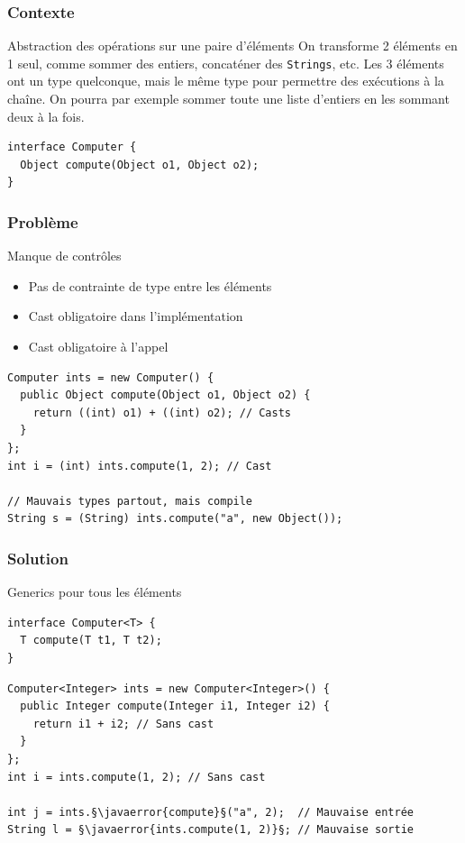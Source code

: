 \documentclass[draft]{beamer}
\makeatletter
\def\uwave{\bgroup\markoverwith{\lower4\p@\hbox{\sixly \textcolor{errorcolor}{\char58}}}\ULon}
\newcommand{\javaerror}[1]{%
  \uwave{#1}%
}
\makeatother
\begin{document}
\begin{frame}[fragile]
\frametitle{Contexte}
\begin{block}{Abstraction des opérations sur une paire d'éléments}
 On transforme 2 éléments en 1 seul, comme sommer des entiers, concaténer des \lstinline{Strings}, etc.
 Les 3 éléments ont un type quelconque, mais le même type pour permettre des exécutions à la chaîne.
 On pourra par exemple sommer toute une liste d'entiers en les sommant deux à la fois.
\end{block}
\begin{lstlisting}
interface Computer {
  Object compute(Object o1, Object o2);
}
\end{lstlisting}
\end{frame}

\begin{frame}[fragile]
\frametitle{Problème}
\begin{alertblock}{Manque de contrôles}
 \begin{itemize}
  \item Pas de contrainte de type entre les éléments
  \item Cast obligatoire dans l'implémentation
  \item Cast obligatoire à l'appel
 \end{itemize}
\end{alertblock}
\begin{lstlisting}
Computer ints = new Computer() {
  public Object compute(Object o1, Object o2) {
    return ((int) o1) + ((int) o2); // Casts
  }
};
int i = (int) ints.compute(1, 2); // Cast

// Mauvais types partout, mais compile
String s = (String) ints.compute("a", new Object());
\end{lstlisting}
\end{frame}

\begin{frame}[fragile]
\frametitle{Solution}
\begin{exampleblock}{Generics pour tous les éléments}
\begin{lstlisting}[numbers=none]
interface Computer<T> {
  T compute(T t1, T t2);
}
\end{lstlisting}
\end{exampleblock}
\begin{lstlisting}
Computer<Integer> ints = new Computer<Integer>() {
  public Integer compute(Integer i1, Integer i2) {
    return i1 + i2; // Sans cast
  }
};
int i = ints.compute(1, 2); // Sans cast

int j = ints.§\javaerror{compute}§("a", 2);  // Mauvaise entrée
String l = §\javaerror{ints.compute(1, 2)}§; // Mauvaise sortie
\end{lstlisting}
\end{frame}
\end{document}
